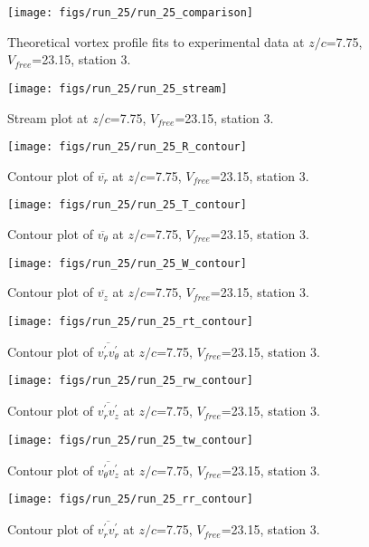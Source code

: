 \begin{figure}[H]
\centering
\texttt{[image: figs/run\_25/run\_25\_comparison]}
\caption{Theoretical vortex profile fits to experimental data at $z/c$=7.75, $V_{free}$=23.15, station 3.}
\end{figure}


\begin{figure}[H]
\centering
\texttt{[image: figs/run\_25/run\_25\_stream]}
\caption{Stream plot at $z/c$=7.75, $V_{free}$=23.15, station 3.}
\end{figure}


\begin{figure}[H]
\centering
\texttt{[image: figs/run\_25/run\_25\_R\_contour]}
\caption{Contour plot of $\overline{v_{r}}$ at $z/c$=7.75, $V_{free}$=23.15, station 3.}
\end{figure}


\begin{figure}[H]
\centering
\texttt{[image: figs/run\_25/run\_25\_T\_contour]}
\caption{Contour plot of $\overline{v_{\theta}}$ at $z/c$=7.75, $V_{free}$=23.15, station 3.}
\end{figure}


\begin{figure}[H]
\centering
\texttt{[image: figs/run\_25/run\_25\_W\_contour]}
\caption{Contour plot of $\overline{v_{z}}$ at $z/c$=7.75, $V_{free}$=23.15, station 3.}
\end{figure}


\begin{figure}[H]
\centering
\texttt{[image: figs/run\_25/run\_25\_rt\_contour]}
\caption{Contour plot of $\overline{v_{r}^{\prime} v_{\theta}^{\prime}}$ at $z/c$=7.75, $V_{free}$=23.15, station 3.}
\end{figure}


\begin{figure}[H]
\centering
\texttt{[image: figs/run\_25/run\_25\_rw\_contour]}
\caption{Contour plot of $\overline{v_{r}^{\prime} v_{z}^{\prime}}$ at $z/c$=7.75, $V_{free}$=23.15, station 3.}
\end{figure}


\begin{figure}[H]
\centering
\texttt{[image: figs/run\_25/run\_25\_tw\_contour]}
\caption{Contour plot of $\overline{v_{\theta}^{\prime} v_{z}^{\prime}}$ at $z/c$=7.75, $V_{free}$=23.15, station 3.}
\end{figure}


\begin{figure}[H]
\centering
\texttt{[image: figs/run\_25/run\_25\_rr\_contour]}
\caption{Contour plot of $\overline{v_{r}^{\prime} v_{r}^{\prime}}$ at $z/c$=7.75, $V_{free}$=23.15, station 3.}
\end{figure}


